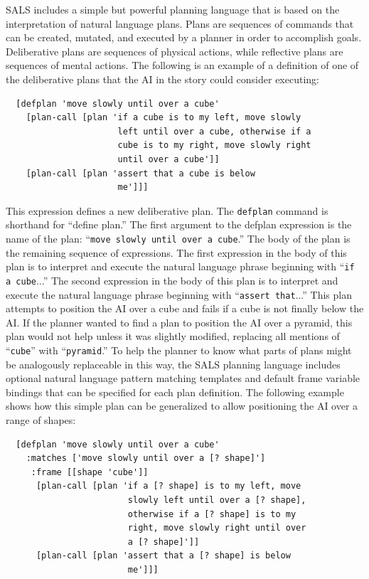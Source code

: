 SALS includes a simple but powerful planning language that is based on
the interpretation of natural language plans.  Plans are sequences of
commands that can be created, mutated, and executed by a planner in
order to accomplish goals.  Deliberative plans are sequences of
physical actions, while reflective plans are sequences of mental
actions.  The following is an example of a definition of one of the
deliberative plans that the AI in the story could consider executing:
\begin{samepage}
\begin{Verbatim}
  [defplan 'move slowly until over a cube'
    [plan-call [plan 'if a cube is to my left, move slowly
                      left until over a cube, otherwise if a
                      cube is to my right, move slowly right
                      until over a cube']]
    [plan-call [plan 'assert that a cube is below
                      me']]]
\end{Verbatim}
\end{samepage}
This expression defines a new deliberative plan.  The {\tt{defplan}}
command is shorthand for ``define plan.''  The first argument to the
defplan expression is the name of the plan: ``{\tt{move slowly until
    over a cube}}.''  The body of the plan is the remaining sequence
of expressions.  The first expression in the body of this plan is to
interpret and execute the natural language phrase beginning with
``{\tt{if a cube}}...''  The second expression in the body of this
plan is to interpret and execute the natural language phrase beginning
with ``{\tt{assert that}}...''  This plan attempts to position the AI
over a cube and fails if a cube is not finally below the AI.  If the
planner wanted to find a plan to position the AI over a pyramid, this
plan would not help unless it was slightly modified, replacing all
mentions of ``{\tt{cube}}'' with ``{\tt{pyramid}}.''  To help the
planner to know what parts of plans might be analogously replaceable
in this way, the SALS planning language includes optional natural
language pattern matching templates and default frame variable
bindings that can be specified for each plan definition.  The
following example shows how this simple plan can be generalized to
allow positioning the AI over a range of shapes:
\begin{samepage}
\begin{Verbatim}
  [defplan 'move slowly until over a cube'
    :matches ['move slowly until over a [? shape]']
     :frame [[shape 'cube']]
      [plan-call [plan 'if a [? shape] is to my left, move
                        slowly left until over a [? shape],
                        otherwise if a [? shape] is to my
                        right, move slowly right until over
                        a [? shape]']]
      [plan-call [plan 'assert that a [? shape] is below
                        me']]]
\end{Verbatim}
\end{samepage}
